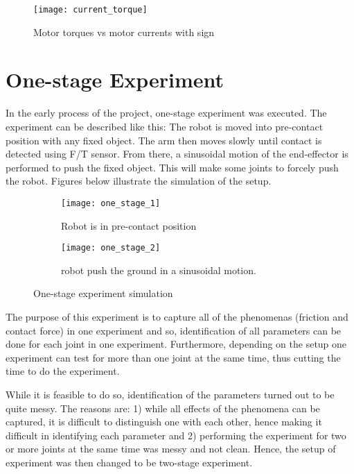 \begin{figure}[H]
    \centering
    \texttt{[image: current\_torque]}
    \caption{Motor torques vs motor currents with sign}
    \label{fig:current vs torque}
\end{figure}

\section{One-stage Experiment}
In the early process of the project, one-stage experiment was executed. The experiment can be described like this: The robot is moved into pre-contact position with any fixed object. The arm then moves slowly until contact is detected using F/T sensor. From there, a sinusoidal motion of the end-effector is performed to push the fixed object. This will make some joints to forcely push the robot. Figures below illustrate the simulation of the setup.

\begin{figure}[H]
  \begin{subfigure}[t]{0.5\textwidth}
    \centering
    \texttt{[image: one\_stage\_1]} 
    \caption{Robot is in pre-contact position}
  \end{subfigure}
  \begin{subfigure}[t]{0.5\textwidth}
    \centering
    \texttt{[image: one\_stage\_2]}
    \caption{robot push the ground in a sinusoidal motion.}
  \end{subfigure}
  \caption{One-stage experiment simulation}
\end{figure}

The purpose of this experiment is to capture all of the phenomenas (friction and contact force) in one experiment and so, identification of all parameters can be done for each joint in one experiment. Furthermore, depending on the setup one experiment can test for more than one joint at the same time, thus cutting the time to do the experiment. 

While it is feasible to do so, identification of the parameters turned out to be quite messy. The reasons are: 1) while all effects of the phenomena can be captured, it is difficult to distinguish one with each other, hence making it difficult in identifying each parameter and 2) performing the experiment for two or more joints at the same time was messy and not clean. Hence, the setup of experiment was then changed to be two-stage experiment.

